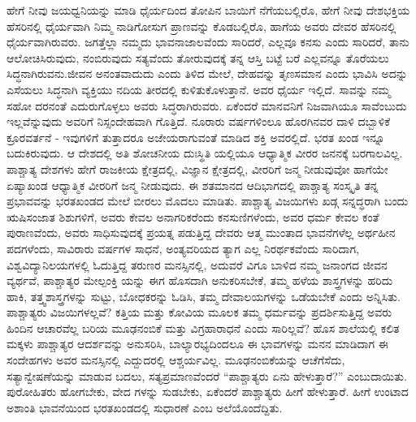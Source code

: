 ಹೇಗೆ ನೀವು ಜಯಧ್ವನಿಯನ್ನು ಮಾಡಿ ಧೈರ್ಯದಿಂದ ತೋಪಿನ ಬಾಯಿಗೆ ನೆಗೆಯಬಲ್ಲಿರೊ, ಹೇಗೆ ನೀವು ದೇಶಭಕ್ತಿಯ ಹೆಸರಿನಲ್ಲಿ ಧೈರ್ಯವಾಗಿ ನಿಮ್ಮ ನಾಡಿಗೋಸುಗ ಪ್ರಾಣವನ್ನು ಕೊಡಬಲ್ಲಿರೊ, ಹಾಗೆಯ ಅವರು ದೇವರ ಹೆಸರಿನಲ್ಲಿ ಧೈರ್ಯವಾಗಿರುವರು. ಜಗತ್ತೆಲ್ಲಾ ನಮ್ಮದು ಭಾವನಾಜಾಲವೆಂದು ಸಾರಿದರೆ, ಎಲ್ಲವೂ ಕನಸು ಎಂದು ಸಾರಿದರೆ, ತಾನು ಆಲೋಚಿಸಿರುವುದು, ನಂಬಿರುವುದು ಸತ್ಯವೆಂದು ತೋರುವುದಕ್ಕೆ ತನ್ನ ಆಸ್ತಿ ಬಟ್ಟೆ ಬರೆ ಎಲ್ಲವನ್ನೂ ತೊರೆಯಲು ಸಿದ್ಧನಾಗಿರುವನು.ಜೀವನ ಅನಂತವಾದುದು ಎಂದು ತಿಳಿದ ಮೇಲೆ, ದೇಹವನ್ನು ತೃಣಸಮಾನ ಎಂದು ಭಾವಿಸಿ ಅದನ್ನು ಎಸೆಯಲು ಸಿದ್ಧನಾಗಿ ವ್ಯಕ್ತಿಯು ನದಿಯ ತೀರದಲ್ಲಿ ಕುಳಿತುಕೊಳುತ್ತಾನೆ. ಅವರ ಧೈರ್ಯ ಇಲ್ಲಿದೆ. ಸಾವನ್ನು ನಮ್ಮ ಸಹೋ ದರನಂತೆ ಎದುರುಗೊಳ್ಳಲು ಅವರು ಸಿದ್ಧರಾಗಿರುವರು. ಏಕೆಂದರೆ ಮಾನವನಿಗೆ ನಿಜವಾಗಿಯೂ ಸಾವೆಂಬುದು ಇಲ್ಲವೆನ್ನುವುದು ಅವರಿಗೆ ನಿಸ್ಸಂದೇಹವಾಗಿ ಗೊತ್ತಿದೆ. ನೂರಾರು ವರ್ಷಗಳಿಂಲೂ ಹೊರಗಿನವರ ದಾಳಿ ದಬ್ಬಾಳಿಕೆ ಕ್ರೂರವರ್ತನೆ - ಇವುಗಳಿಗೆ ತುತ್ತಾದರೂ ಅಜೇಯರಾಗುವಂತೆ ಮಾಡಿದ ಶಕ್ತಿ ಅವರಲ್ಲಿದೆ. ಭರತ ಖಂಡ ಇನ್ನೂ ಬದುಕಿರುವುದು. ಆ ದೇಶದಲ್ಲಿ ಅತಿ ಶೋಚನೀಯ ದುಃಸ್ಥಿತಿ ಯಲ್ಲಿಯೂ ಆಧ್ಯಾತ್ಮಿಕ ವೀರರ ಜನನಕ್ಕೆ ಬರಗಾಲವಿಲ್ಲ. ಪಾಶ್ಚಾತ್ಯ ದೇಶಗಳು ಹೇಗೆ ರಾಜಕೀಯ ಕ್ಷೇತ್ರದಲ್ಲಿ, ವಿಜ್ಞಾನ ಕ್ಷೇತ್ರದಲ್ಲಿ, ವೀರರಿಗೆ ಜನ್ಮ ನೀಡುವುವೋ ಹಾಗೆಯೇ ಏಷ್ಯಾಖಂಡ ಆಧ್ಯಾತ್ಮಿಕ ವೀರರಿಗೆ ಜನ್ಮ ನೀಡುವುದು. ಈ ಶತಮಾನದ ಆದಿಭಾಗದಲ್ಲಿ ಪಾಶ್ಚಾತ್ಯ ಸಂಸ್ಕೃತಿ ತನ್ನ ಪ್ರಭಾವವನ್ನು ಭರತಖಂಡದ ಮೇಲೆ ಬೀರಲು ಮೊದಲು ಮಾಡಿತು. ಪಾಶ್ಚಾತ್ಯ ವಿಜಯಿಗಳು ಖಡ್ಗ ಸನ್ನದ್ಧರಾಗಿ ಬಂದು ಋಷಿಸಂಜಾತ ಶಿಶುಗಳಿಗೆ, ಅವರು ಕೇವಲ ಅನಾಗರಿಕರೆಂದು ಕನಸುಣಿಗಳೆಂದು, ಅವರ ಧರ್ಮ ಕೇವಲ ಕಂತೆ ಪುರಾಣವೆಂದು, ಅವರು ಸಾಧಿಸುವುದಕ್ಕೆ ಪ್ರಯತ್ನ ಪಡುತ್ತಿದ್ದ ದೇವರು ಆತ್ಮ ಮುಂತಾದ ಭಾವನೆಗಳೆಲ್ಲ ಅರ್ಥಹೀನ ಪದಗಳೆಂದು, ಸಾವಿರಾರು ವರ್ಷಗಳ ಸಾಧನೆ, ಅಂತ್ಯವರಿಯದ ತ್ಯಾಗ ಎಲ್ಲ ನಿರರ್ಥಕವೆಂದು ಸಾರಿದಾಗ, ವಿಶ್ವವಿದ್ಯಾನಿಲಯಗಳಲ್ಲಿ ಓದುತ್ತಿದ್ದ ತರುಣರ ಮನಸ್ಸಿನಲ್ಲಿ, ಅದುವರೆ ವಿಗೂ ಬಾಳಿದ ನಮ್ಮ ಜನಾಂಗದ ಜೀವನ ವ್ಯರ್ಥವೆ, ಪಾಶ್ಚಾತ್ಯರ ಮೇಲ್ಪಂಕ್ತಿ ಯನ್ನು ಈಗ ಹೊಸದಾಗಿ ಅನುಕರಿಸಬೇಕೆ, ತಮ್ಮ ಹಳೆಯ ಶಾಸ್ತ್ರಗಳನ್ನು ಹರಿದು ಹಾಕಿ, ತತ್ತ್ವಶಾಸ್ತ್ರಗಳನ್ನು ಸುಟ್ಟು, ಬೋಧಕರನ್ನು ಓಡಿಸಿ, ತಮ್ಮ ದೇವಾಲಯಗಳನ್ನು ಒಡೆಯಬೇಕೆ ಎಂದು ಅನ್ನಿಸಿತು. ಪಾಶ್ಚಾತ್ಯರು ವಿಜಯಿಗಳಲ್ಲವೆ? ಕತ್ತಿಯ ಮತ್ತು ಕೋವಿಯ ಮೂಲಕ ತಮ್ಮ ಧರ್ಮವನ್ನು ಪ್ರದರ್ಶಿಸುತ್ತಿದ್ದ ಅವರು ಹಿಂದಿನ ಆಚಾರವೆಲ್ಲ ಬರಿಯ ಮೂಢನಂಬಿಕೆ ಮತ್ತು ವಿಗ್ರಹಾರಾಧನೆ ಎಂದು ಸಾರಿಲ್ಲವೆ? ಹೊಸ ಶಾಲೆಯಲ್ಲಿ ಕಲಿತ ಮಕ್ಕಳು ಪಾಶ್ಚಾತ್ಯರ ಆದರ್ಶವನ್ನು ಅನುಸರಿಸಿ, ಬಾಲ್ಯಾರಭ್ಯದಿಂದಲೂ ಈ ಭಾವಗಳನ್ನು ಮನನ ಮಾಡಿದಾಗ ಈ ಸಂದೇಹಗಳು ಅವರ ಮನಸ್ಸಿನಲ್ಲಿ ಎದ್ದುದರಲ್ಲಿ ಆಶ್ಚರ್ಯವಿಲ್ಲ. ಮೂಢನಂಬಿಕೆಯನ್ನು ಆಚೆಗೆಸೆದು, ಸತ್ಯಾನ್ವೇಷಣೆಯನ್ನು ಮಾಡುವ ಬದಲು, ಸತ್ಯಪ್ರಮಾಣವೆಂದರೆ “ಪಾಶ್ಚಾತ್ಯರು ಏನು ಹೇಳುತ್ತಾರೆ?” ಎಂಬುದಾಯಿತು. ಪುರೋಹಿತರು ಹೋಗಬೇಕು, ವೇದ ಗಳನ್ನು ಸುಡಬೇಕು, ಏಕೆಂದರೆ ಪಾಶ್ಚಾತ್ಯರು ಹೀಗೆ ಹೇಳುತ್ತಾರೆ. ಹೀಗೆ ಉಂಟಾದ ಅಶಾಂತಿ ಭಾವನೆಯಿಂದ ಭರತಖಂಡದಲ್ಲಿ ಸುಧಾರಣೆ ಎಂಬ ಅಲೆಯೊಂದೆದ್ದಿತು.

